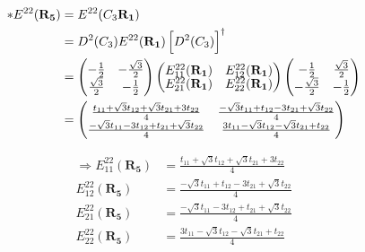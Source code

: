 \documentclass{report}
\begin{document}
\begin{align*}
	\ast E^{22}(\mathbf{R_5}) & = E^{22}(C_3\mathbf{ R_1})                                                                                                       \\
	                          & = D^2(C_3)  E^{22}(\mathbf{R_1}) \left[ D^2(C_3) \right]^\dagger                                                                 \\
	                          & =
	\begin{pmatrix}
		\renewcommand{\arraystretch}{0.72}
		-\frac{1}{2}       & -\frac{\sqrt{3}}{2} \\
		\frac{\sqrt{3}}{2} & -\frac{1}{2}
	\end{pmatrix}
	\begin{pmatrix}
		E_{11}^{22}(\mathbf{R_1}) & E_{12}^{22}(\mathbf{R_1}) \\
		E_{21}^{22}(\mathbf{R_1}) & E_{22}^{22}(\mathbf{R_1})
	\end{pmatrix}
	\begin{pmatrix}
		-\frac{1}{2}        & \frac{\sqrt{3}}{2} \\
		-\frac{\sqrt{3}}{2} & -\frac{1}{2}
	\end{pmatrix}                                                                                                     \\
	                          & = \begin{pmatrix}
		                              \frac{t_{11} + \sqrt{3}t_{12} + \sqrt{3}t_{21} + 3t_{22}}{4}  & \frac{-\sqrt{3}t_{11} + t_{12} - 3 t_{21} + \sqrt{3}t_{22}}{4} \\
		                              \frac{-\sqrt{3}t_{11} - 3t_{12} + t_{21} + \sqrt{3}t_{22}}{4} & \frac{3t_{11} - \sqrt{3}t_{12} - \sqrt{3}t_{21} + t_{22}}{4}
	                              \end{pmatrix}
\end{align*}

\begin{align*}
	\Rightarrow E_{11}^{22}(\mathbf{R_5}) & =  \frac{t_{11} + \sqrt{3}t_{12} + \sqrt{3}t_{21} + 3t_{22}}{4}  \\
	E_{12}^{22}(\mathbf{R_5})             & = \frac{-\sqrt{3}t_{11} + t_{12} - 3 t_{21} + \sqrt{3}t_{22}}{4} \\
	E_{21}^{22}(\mathbf{R_5})             & = \frac{-\sqrt{3}t_{11} - 3t_{12} + t_{21} + \sqrt{3}t_{22}}{4}  \\
	E_{22}^{22}(\mathbf{R_5})             & = \frac{3t_{11} - \sqrt{3}t_{12} - \sqrt{3}t_{21} + t_{22}}{4}   \\
\end{align*}
\end{document}
